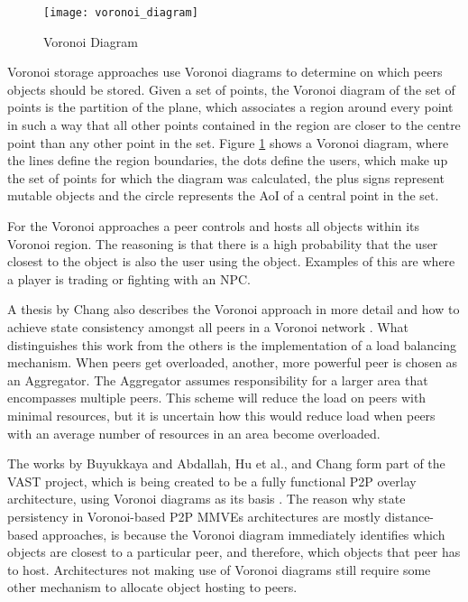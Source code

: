 \begin{figure}[htbp]
 \centering
 \texttt{[image: voronoi\_diagram]}
 \caption{Voronoi Diagram \cite{Buyukkaya_voronoi_state_management}}
 \label{fig_voronoi_diagram}
\end{figure}
%
Voronoi storage approaches use Voronoi diagrams to determine on which peers objects should be stored. Given a set of points, the Voronoi diagram of the set of points is the partition of the plane, which associates a region around every point in such a way that all other points contained in the region are closer to the centre point than any other point in the set. Figure \ref{fig_voronoi_diagram} shows a Voronoi diagram, where the lines define the region boundaries, the dots define the users, which make up the set of points for which the diagram was calculated, the plus signs represent mutable objects and the circle represents the AoI of a central point in the set.

For the Voronoi approaches a peer controls and hosts all objects within its Voronoi region. The reasoning is that there is a high probability that the user closest to the object is also the user using the object. Examples of this are where a player is trading or fighting with an NPC.

A thesis by Chang also describes the Voronoi approach in more detail and how to achieve state consistency amongst all peers in a Voronoi network \cite{Chang_Voronoi_state_management_masters}. What distinguishes this work from the others is the implementation of a load balancing mechanism. When peers get overloaded, another, more powerful peer is chosen as an Aggregator. The Aggregator assumes responsibility for a larger area that encompasses multiple peers. This scheme will reduce the load on peers with minimal resources, but it is uncertain how this would reduce load when peers with an average number of resources in an area become overloaded.

The works by Buyukkaya and Abdallah, Hu et al., and Chang form part of the VAST project, which is being created to be a fully functional P2P overlay architecture, using Voronoi diagrams as its basis \cite{VAST}. The reason why state persistency in Voronoi-based P2P MMVEs architectures are mostly distance-based approaches, is because the Voronoi diagram immediately identifies which objects are closest to a particular peer, and therefore, which objects that peer has to host. Architectures not making use of Voronoi diagrams still require some other mechanism to allocate object hosting to peers.


